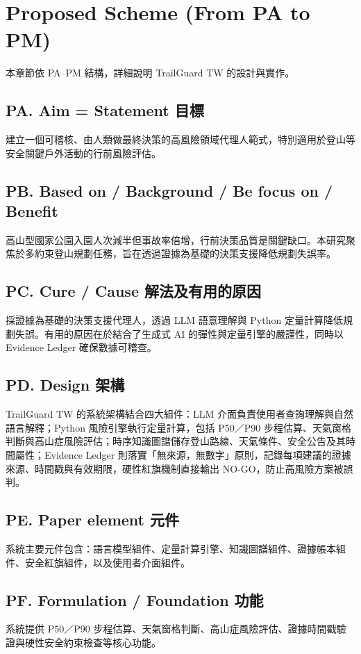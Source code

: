 \documentclass[12pt,a4paper]{article}
\begin{document}
\section{Proposed Scheme (From PA to PM)}
本章節依 PA–PM 結構，詳細說明 TrailGuard TW 的設計與實作。

\subsection*{PA. Aim = Statement 目標}
建立一個可稽核、由人類做最終決策的高風險領域代理人範式，特別適用於登山等安全關鍵戶外活動的行前風險評估。

\subsection*{PB. Based on / Background / Be focus on / Benefit}
高山型國家公園入園人次減半但事故率倍增，行前決策品質是關鍵缺口。本研究聚焦於多約束登山規劃任務，旨在透過證據為基礎的決策支援降低規劃失誤率。

\subsection*{PC. Cure / Cause 解法及有用的原因}
採證據為基礎的決策支援代理人，透過 LLM 語意理解與 Python 定量計算降低規劃失誤。有用的原因在於結合了生成式 AI 的彈性與定量引擎的嚴謹性，同時以 Evidence Ledger 確保數據可稽查。

\subsection*{PD. Design 架構}
TrailGuard TW 的系統架構結合四大組件：LLM 介面負責使用者查詢理解與自然語言解釋；Python 風險引擎執行定量計算，包括 P50／P90 步程估算、天氣窗格判斷與高山症風險評估；時序知識圖譜儲存登山路線、天氣條件、安全公告及其時間屬性；Evidence Ledger 則落實「無來源，無數字」原則，記錄每項建議的證據來源、時間戳與有效期限，硬性紅旗機制直接輸出 NO-GO，防止高風險方案被誤判。

\subsection*{PE. Paper element 元件}
系統主要元件包含：語言模型組件、定量計算引擎、知識圖譜組件、證據帳本組件、安全紅旗組件，以及使用者介面組件。

\subsection*{PF. Formulation / Foundation 功能}
系統提供 P50／P90 步程估算、天氣窗格判斷、高山症風險評估、證據時間戳驗證與硬性安全約束檢查等核心功能。
\end{document}
